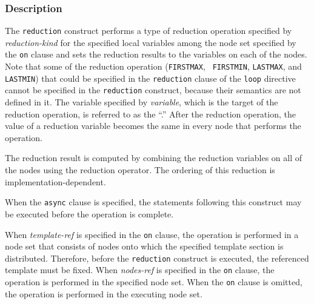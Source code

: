 \subsubsection*{Description}

The {\tt reduction} construct performs a type of
reduction operation specified by {\it reduction-kind} for the specified
local variables among the node set specified by the {\tt on}
clause and sets the reduction results to the variables on each of the
nodes.
%
Note that some of the reduction operation ({\tt FIRSTMAX}, {\tt
FIRSTMIN}, {\tt LASTMAX}, and {\tt LASTMIN}) that could be specified in
the {\tt reduction} clause of the {\tt loop} directive cannot be
specified in the {\tt reduction} construct, because their semantics are
not defined in it.
%
The variable specified by {\it variable}, which is the target of the
reduction operation, is referred to as the ``.'' After the reduction operation, the value of a reduction
variable becomes the same in every node that performs the operation.

The reduction result is computed by combining the reduction variables on
all of the nodes using the reduction operator. The ordering of this
reduction is implementation-dependent.

When the {\tt async} clause is specified, the statements following this
construct may be executed before the operation is complete.

When {\it template-ref} is specified in the {\tt on} clause, the operation
is performed in a node set that consists of nodes onto which the
specified template section is distributed.
Therefore, before the {\tt reduction} construct is executed, the
referenced template must be fixed.
%
%
%
When {\it nodes-ref} is specified in the {\tt on} clause, the operation
is performed in the specified node set.
%
When the {\tt on} clause is omitted, the operation is performed in the
executing node set.

